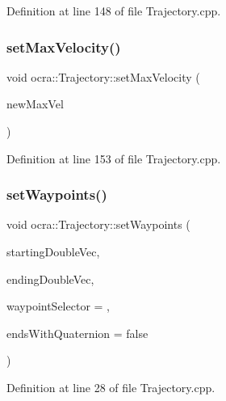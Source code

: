 Definition at line 148 of file Trajectory.\+cpp.

\hypertarget{classocra_1_1Trajectory_accba854a05f9b17859c0a7f2e0820958}{}\label{classocra_1_1Trajectory_accba854a05f9b17859c0a7f2e0820958} 
\subsubsection{\texorpdfstring{set\+Max\+Velocity()}{setMaxVelocity()}\hspace{0.1cm}{\footnotesize\ttfamily [2/2]}}
{\footnotesize\ttfamily void ocra\+::\+Trajectory\+::set\+Max\+Velocity (\begin{DoxyParamCaption}\item[{const Eigen\+::\+Vector\+Xd \&}]{new\+Max\+Vel }\end{DoxyParamCaption})}



Definition at line 153 of file Trajectory.\+cpp.

\hypertarget{classocra_1_1Trajectory_af8ae6008824f92f5de31edf0944f4fbd}{}\label{classocra_1_1Trajectory_af8ae6008824f92f5de31edf0944f4fbd} 
\subsubsection{\texorpdfstring{set\+Waypoints()}{setWaypoints()}\hspace{0.1cm}{\footnotesize\ttfamily [1/6]}}
{\footnotesize\ttfamily void ocra\+::\+Trajectory\+::set\+Waypoints (\begin{DoxyParamCaption}\item[{const std\+::vector$<$ double $>$ \&}]{starting\+Double\+Vec,  }\item[{const std\+::vector$<$ double $>$ \&}]{ending\+Double\+Vec,  }\item[{const int}]{waypoint\+Selector = {},  }\item[{bool}]{ends\+With\+Quaternion = {\ttfamily false} }\end{DoxyParamCaption})}



Definition at line 28 of file Trajectory.\+cpp.

